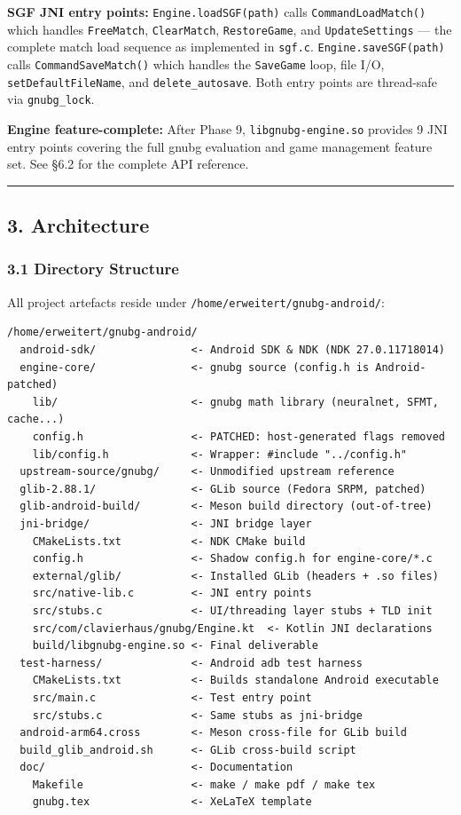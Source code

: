 \documentclass[11pt,a4paper]{article}
\begin{document}
\textbf{SGF JNI entry points:} \texttt{Engine.loadSGF(path)} calls
\texttt{CommandLoadMatch()} which handles \texttt{FreeMatch},
\texttt{ClearMatch}, \texttt{RestoreGame}, and \texttt{UpdateSettings}
--- the complete match load sequence as implemented in \texttt{sgf.c}.
\texttt{Engine.saveSGF(path)} calls \texttt{CommandSaveMatch()} which
handles the \texttt{SaveGame} loop, file I/O,
\texttt{setDefaultFileName}, and \texttt{delete\_autosave}. Both entry
points are thread-safe via \texttt{gnubg\_lock}.

\textbf{Engine feature-complete:} After Phase 9,
\texttt{libgnubg-engine.so} provides 9 JNI entry points covering the
full gnubg evaluation and game management feature set. See §6.2 for the
complete API reference.

\begin{center}\rule{0.5\linewidth}{0.5pt}\end{center}

\subsection{3. Architecture}\label{architecture}

\subsubsection{3.1 Directory Structure}\label{directory-structure}

All project artefacts reside under
\texttt{/home/erweitert/gnubg-android/}:

\begin{verbatim}
/home/erweitert/gnubg-android/
  android-sdk/               <- Android SDK & NDK (NDK 27.0.11718014)
  engine-core/               <- gnubg source (config.h is Android-patched)
    lib/                     <- gnubg math library (neuralnet, SFMT, cache...)
    config.h                 <- PATCHED: host-generated flags removed
    lib/config.h             <- Wrapper: #include "../config.h"
  upstream-source/gnubg/     <- Unmodified upstream reference
  glib-2.88.1/               <- GLib source (Fedora SRPM, patched)
  glib-android-build/        <- Meson build directory (out-of-tree)
  jni-bridge/                <- JNI bridge layer
    CMakeLists.txt           <- NDK CMake build
    config.h                 <- Shadow config.h for engine-core/*.c
    external/glib/           <- Installed GLib (headers + .so files)
    src/native-lib.c         <- JNI entry points
    src/stubs.c              <- UI/threading layer stubs + TLD init
    src/com/clavierhaus/gnubg/Engine.kt  <- Kotlin JNI declarations
    build/libgnubg-engine.so <- Final deliverable
  test-harness/              <- Android adb test harness
    CMakeLists.txt           <- Builds standalone Android executable
    src/main.c               <- Test entry point
    src/stubs.c              <- Same stubs as jni-bridge
  android-arm64.cross        <- Meson cross-file for GLib build
  build_glib_android.sh      <- GLib cross-build script
  doc/                       <- Documentation
    Makefile                 <- make / make pdf / make tex
    gnubg.tex                <- XeLaTeX template
\end{verbatim}
\end{document}
